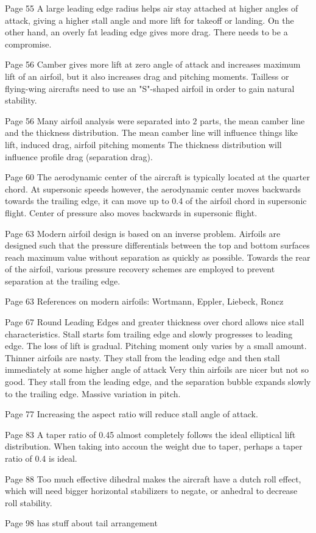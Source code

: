 
Page 55
A large leading edge radius helps air stay attached at higher angles of attack, giving a higher stall angle and more lift for takeoff or landing. 
On the other hand, an overly fat leading edge gives more drag. There needs to be a compromise.

Page 56
Camber gives more lift at zero angle of attack and increases maximum lift of an airfoil, but it also increases drag and pitching moments. 
Tailless or flying-wing aircrafts need to use an "S"-shaped airfoil in order to gain natural stability. 

Page 56
Many airfoil analysis were separated into $2$ parts, the mean camber line and the thickness distribution.
The mean camber line will influence things like lift, induced drag, airfoil pitching moments
The thickness distribution will influence profile drag (separation drag).

Page 60
The aerodynamic center of the aircraft is typically located at the quarter chord.
At supersonic speeds however, the aerodynamic center moves backwards towards the trailing edge, it can move up to 0.4 of the airfoil chord in supersonic flight.
Center of pressure also moves backwards in supersonic flight.

Page 63
Modern airfoil design is based on an inverse problem.
Airfoils are designed such that the pressure differentials between the top and bottom surfaces reach maximum value without separation as quickly as possible. 
Towards the rear of the airfoil, various pressure recovery schemes are employed to prevent separation at the trailing edge.

Page 63
References on modern airfoils:
Wortmann, Eppler, Liebeck, Roncz

Page 67
Round Leading Edges and greater thickness over chord allows nice stall characteristics.
Stall starts fom trailing edge and slowly progresses to leading edge.
The loss of lift is gradual. Pitching moment only varies by a small amount.
Thinner airfoils are nasty. 
They stall from the leading edge and then stall immediately at some higher angle of attack
Very thin airfoils are nicer but not so good. 
They stall from the leading edge, and the separation bubble expands slowly to the trailing edge. 
Massive variation in pitch.

Page 77
Increasing the aspect ratio will reduce stall angle of attack.

Page 83
A taper ratio of 0.45 almost completely follows the ideal elliptical lift distribution.
When taking into accoun the weight due to taper, perhaps a taper ratio of 0.4 is ideal.

Page 88
Too much effective dihedral makes the aircraft have a dutch roll effect, which will need bigger horizontal stabilizers to negate, or anhedral to decrease roll stability.

Page 98 has stuff about tail arrangement
